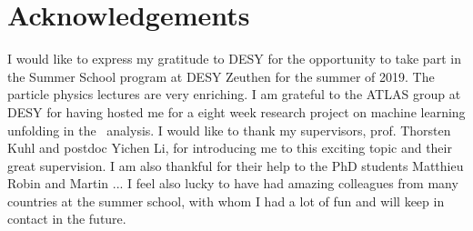 \section*{Acknowledgements}
\label{sec:Acknowledgements}

I would like to express my gratitude to DESY for the opportunity to take part in the Summer School program at DESY Zeuthen for the summer of 2019. The particle physics lectures are very enriching. I am grateful to the ATLAS group at DESY for having hosted me for a eight week research project on machine learning unfolding in the \ttbaremu~analysis. I would like to thank my supervisors, prof. Thorsten Kuhl and postdoc Yichen Li, for introducing me to this exciting topic and their great supervision. I am also thankful for their help to the PhD students Matthieu Robin and Martin ... I feel also lucky to have had amazing colleagues from many countries at the summer school, with whom I had a lot of fun and will keep in contact in the future.
